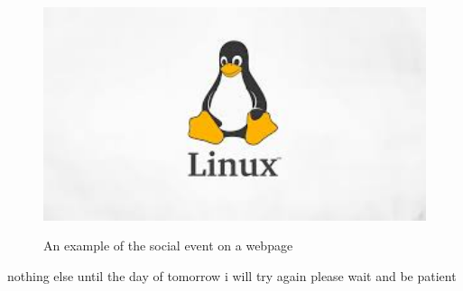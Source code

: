 \begin{figure}[h]
\begin{center}
\includegraphics[height=7cm]{figures01/linux1.jpeg}
\caption{An example of the social event on a webpage}
\label{fig:webevent}
\end{center}
\end{figure}

nothing else until the day of tomorrow i will try again please wait and be patient

